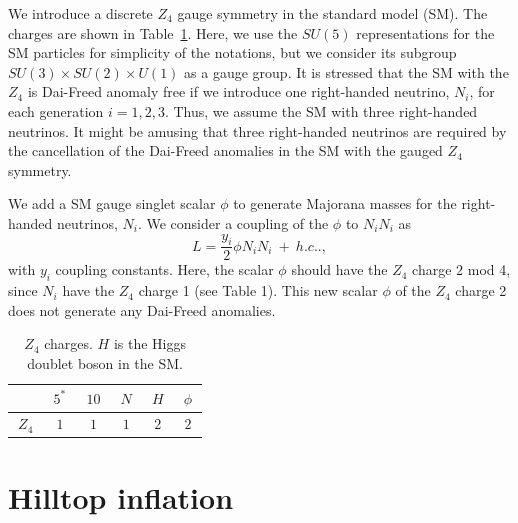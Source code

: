 \documentclass[11pt,a4paper]{article}
\begin{document}
We introduce a discrete $Z_4$ gauge symmetry in the standard model (SM). The charges are shown in Table~\ref{table:Z4_charge}. Here, we use the $SU(5)$ representations for the SM particles for simplicity of the notations, but we consider its subgroup $SU(3)\times SU(2)\times U(1)$ as a gauge group. It is stressed \cite{Garcia-Etxebarria:2018ajm} that the SM with the $Z_4$ is Dai-Freed anomaly free if we introduce one right-handed neutrino, $N_i$, for each generation $i=1,2,3$. Thus, we assume the SM with three right-handed neutrinos. %
It might be amusing that three right-handed neutrinos are required by the cancellation of the Dai-Freed anomalies in the SM with the gauged $Z_4$ symmetry.

We add a SM gauge singlet scalar $\phi$ to generate Majorana masses for the right-handed neutrinos, $N_i$. We consider a coupling of the $\phi$ to $N_i N_i$ as
\begin{equation}
    \label{eq:inflaton-Rneutrino}
    L=\frac{y_i}{2}\phi N_iN_i~ +~ h.c..,
\end{equation}
with $y_i$ coupling constants.
Here, the scalar $\phi$ should have the $Z_4$ charge ${2}$ mod 4, since $N_i$ have the  $Z_4$ charge 1 (see Table 1). This new scalar $\phi$ of the $Z_4$ charge 2 does not generate any Dai-Freed anomalies. 

\begin{table}[t]
    \centering
    \begin{tabular}{|c|ccccc|}
        \hline
               & $~5^*~$ & $~10~$   & $~N~$  & $~H~$  & $~\phi~$ \\
        \hline\hline
         $~Z_4~$ &  $1$  & $1$    & $1$  & $2$  & $2$   \\
        \hline 
    \end{tabular}
    \caption{$Z_4$ charges. $H$ is the Higgs doublet boson in the SM.}
    \label{table:Z4_charge}
\end{table}




\section{Hilltop inflation}
\label{sec:hilltop_inf}
\end{document}
